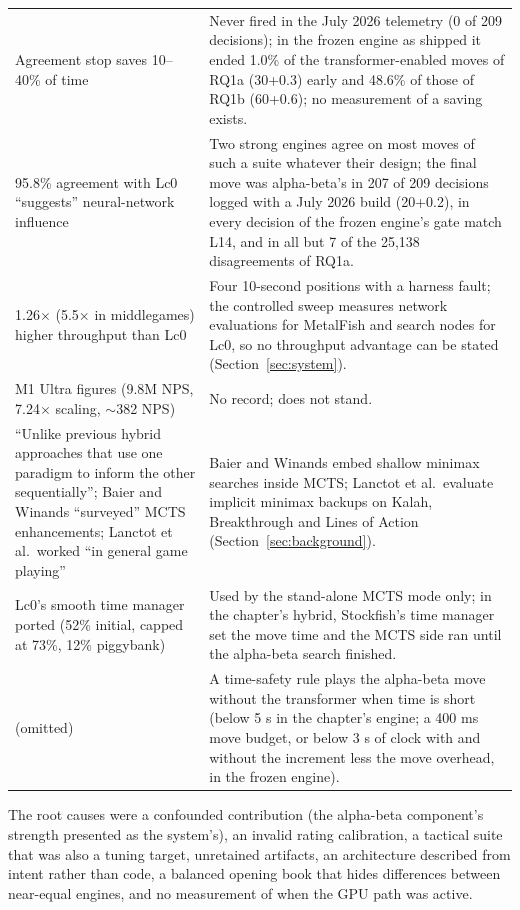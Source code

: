 \documentclass{article}
\newcommand{\MF}{MetalFish}
\begin{document}
\begin{table}[t]
\begin{tabular}{p{5.2cm}p{9.4cm}}
Agreement stop saves 10--40\% of time & Never fired in the July 2026 telemetry (0 of 209 decisions); in the frozen engine as shipped it ended 1.0\% of the transformer-enabled moves of RQ1a (30+0.3) early and 48.6\% of those of RQ1b (60+0.6); no measurement of a saving exists. \\
95.8\% agreement with Lc0 ``suggests'' neural-network influence & Two strong engines agree on most moves of such a suite whatever their design; the final move was alpha-beta's in 207 of 209 decisions logged with a July 2026 build (20+0.2), in every decision of the frozen engine's gate match L14, and in all but 7 of the 25{,}138 disagreements of RQ1a. \\
1.26$\times$ (5.5$\times$ in middlegames) higher throughput than Lc0 & Four 10-second positions with a harness fault; the controlled sweep measures network evaluations for \MF{} and search nodes for Lc0, so no throughput advantage can be stated (Section~\ref{sec:system}). \\
M1 Ultra figures (9.8M NPS, 7.24$\times$ scaling, $\sim$382 NPS) & No record; does not stand. \\
``Unlike previous hybrid approaches that use one paradigm to inform the other sequentially''; Baier and Winands ``surveyed'' MCTS enhancements; Lanctot et al.\ worked ``in general game playing'' & Baier and Winands embed shallow minimax searches inside MCTS; Lanctot et al.\ evaluate implicit minimax backups on Kalah, Breakthrough and Lines of Action (Section~\ref{sec:background}). \\
Lc0's smooth time manager ported (52\% initial, capped at 73\%, 12\% piggybank) & Used by the stand-alone MCTS mode only; in the chapter's hybrid, Stockfish's time manager set the move time and the MCTS side ran until the alpha-beta search finished. \\
(omitted) & A time-safety rule plays the alpha-beta move without the transformer when time is short (below 5 s in the chapter's engine; a 400 ms move budget, or below 3 s of clock with and without the increment less the move overhead, in the frozen engine). \\
\bottomrule
\end{tabular}
\end{table}

The root causes were a confounded contribution (the alpha-beta component's strength presented as the system's), an invalid rating calibration, a tactical suite that was also a tuning target, unretained artifacts, an architecture described from intent rather than code, a balanced opening book that hides differences between near-equal engines, and no measurement of when the GPU path was active.
\end{document}
